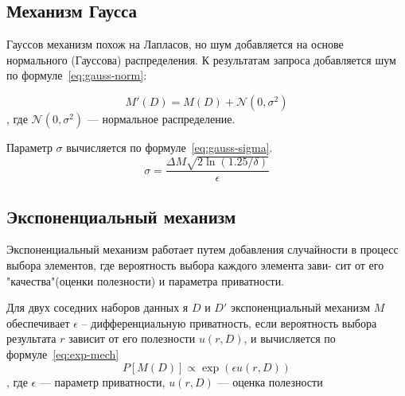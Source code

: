 \subsection{Механизм Гаусса} 
Гауссов механизм похож на Лапласов, но шум добавляется на основе нормального (Гауссова) распределения.
К результатам запроса добавляется шум по формуле~\ref{eq:gauss-norm}:

\begin{equation}\label{eq:gauss-norm}
	M'(D) = M(D) + \mathcal{N}(0, \sigma^2)
\end{equation}
, где $\mathcal{N}(0, \sigma^2)$ --- нормальное распределение.

Параметр $\sigma$ вычисляется по формуле~\ref{eq:gauss-sigma}.
\begin{equation}\label{eq:gauss-sigma}
	\sigma = \frac{\Delta M \sqrt{2 \ln(1.25/\delta)}}{\epsilon}
\end{equation}

\subsection{Экспоненциальный механизм}
Экспоненциальный механизм работает путем добавления случайности в
процесс выбора элементов, где вероятность выбора каждого элемента зави-
сит от его "качества"(оценки полезности) и параметра приватности.

Для двух соседних наборов данных я $D$ и $D'$  экспоненциальный механизм $M$ обеспечивает $\epsilon$ -- дифференциальную приватность, если вероятность выбора результата $r$ зависит от его полезности $u(r, D)$, и вычисляется по формуле~\ref{eq:exp-mech}
\begin{equation}\label{eq:exp-mech}
	P[M(D)] \propto \exp(\epsilon  u(r, D))
\end{equation}
, где $\epsilon$ --- параметр приватности, $u(r, D)$ --- оценка полезности 

